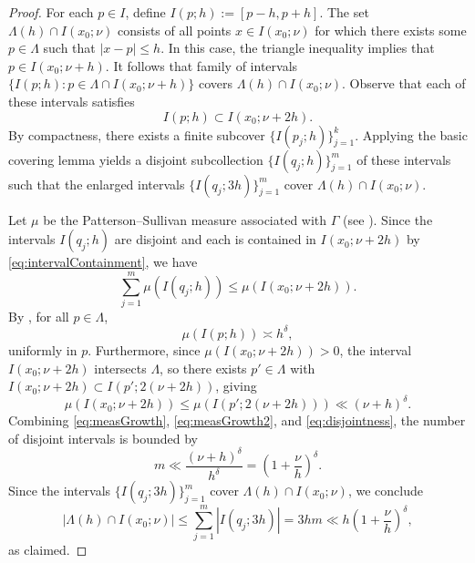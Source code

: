 \documentclass[12pt,letterpaper]{amsart}
\theoremstyle{plain}
\theoremstyle{definition}
\theoremstyle{remark}
\begin{document}
\begin{proof}
For each $p \in I$, define $I(p; h) := [p - h, p + h]$. The set $\Lambda(h) \cap I(x_0;\nu) $ consists of all points $x\in I(x_0;\nu)$ for which there exists some $p\in \Lambda$ such that $\vert x-p\vert \leqslant h$. In this case, the triangle inequality implies that $p\in I(x_0; \nu + h).$ It follows that family of intervals $\{ I(p; h) : p \in \Lambda \cap I(x_0;  \nu + h) \}$ covers $\Lambda(h) \cap I(x_0; \nu)$. Observe that each of these intervals satisfies
\begin{equation}\label{eq:intervalContainment}
I(p; h) \subset I(x_0; \nu + 2h).
\end{equation}
By compactness, there exists a finite subcover $\{I(p_j; h)\}_{j=1}^k$. Applying the basic covering lemma yields a disjoint subcollection $\{I(q_j; h)\}_{j=1}^m$ of these intervals such that the enlarged intervals $\{I(q_j; 3h)\}_{j=1}^m$ cover $\Lambda(h) \cap I(x_0; \nu)$.

Let $\mu$ be the Patterson–Sullivan measure associated with $\Gamma$ (see \cite[Chapter~14]{Borthwick_book}). Since the intervals $I(q_j; h)$ are disjoint and each is contained in $I(x_0; \nu + 2h)$ by \eqref{eq:intervalContainment}, we have
\begin{equation}\label{eq:disjointness}
\sum_{j=1}^m \mu(I(q_j; h)) \le \mu(I(x_0; \nu + 2h)).
\end{equation}
By \cite[Lemma~14.13]{Borthwick_book}, for all $p \in \Lambda$,
\begin{equation}\label{eq:measGrowth}
\mu(I(p; h)) \asymp h^\delta,
\end{equation}
uniformly in $p$. Furthermore, since $\mu(I(x_0; \nu + 2h)) > 0$, the interval $I(x_0; \nu + 2h)$ intersects $\Lambda$, so there exists $p' \in \Lambda$ with $I(x_0; \nu + 2h) \subset I(p'; 2(\nu + 2h))$, giving
\begin{equation}\label{eq:measGrowth2}
\mu(I(x_0; \nu + 2h)) \le \mu( I(p'; 2(\nu + 2h))) \ll (\nu + h)^\delta.
\end{equation}
Combining \eqref{eq:measGrowth}, \eqref{eq:measGrowth2}, and \eqref{eq:disjointness}, the number of disjoint intervals is bounded by
\[
m \ll \frac{(\nu + h)^\delta}{h^\delta} = \left(1 + \frac{\nu}{h}\right)^\delta.
\]
Since the intervals $\{I(q_j; 3h)\}_{j=1}^m$ cover $\Lambda(h) \cap I(x_0; \nu)$, we conclude
\[
|\Lambda(h) \cap I(x_0; \nu)| \le \sum_{j=1}^m |I(q_j; 3h)| = 3hm \ll h \left(1 + \frac{\nu}{h} \right)^\delta,
\]
as claimed.
\end{proof}
\end{document}
